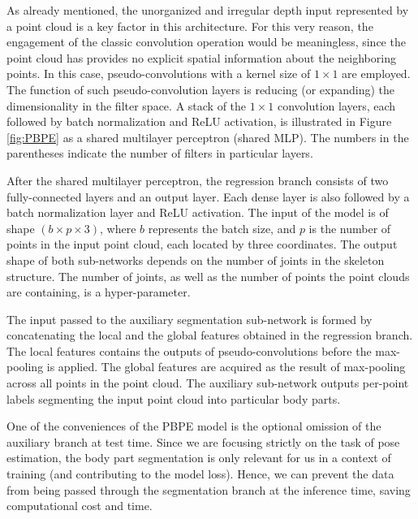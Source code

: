 \noindent
As already mentioned, the unorganized and irregular depth input represented by a point cloud is a key factor in this architecture. For this very reason, the engagement of the classic convolution operation would be meaningless, since the point cloud has provides no explicit spatial information about the neighboring points. In this case, pseudo-convolutions with a kernel size of $1\times1$ are employed. The function of such pseudo-convolution layers is reducing (or expanding) the dimensionality in the filter space. A stack of the $1 \times 1$ convolution layers, each followed by batch normalization and ReLU activation, is illustrated in Figure \ref{fig:PBPE} as a shared multilayer perceptron (shared MLP). The numbers in the parentheses indicate the number of filters in particular layers.\par
\vspace{5mm}
\noindent After the shared multilayer perceptron, the regression branch consists of two fully-connected layers and an output layer. Each dense layer is also followed by a batch normalization layer and ReLU activation. The input of the model is of shape $(b \times p \times 3)$, where $b$ represents the batch size, and $p$ is the number of points in the input point cloud, each located by three coordinates. The output shape of both sub-networks depends on the number of joints in the skeleton structure. The number of joints, as well as the number of points the point clouds are containing, is a hyper-parameter.\par
\vspace{5mm}
\noindent The input passed to the auxiliary segmentation sub-network is formed by concatenating the local and the global features obtained in the regression branch. The local features contains the outputs of pseudo-convolutions before the max-pooling is applied. The global features are acquired as the result of max-pooling across all points in the point cloud. The auxiliary sub-network outputs per-point labels segmenting the input point cloud into particular body parts.\par
\vspace{5mm}
\noindent One of the conveniences of the PBPE model is the optional omission of the auxiliary branch at test time. Since we are focusing strictly on the task of pose estimation, the body part segmentation is only relevant for us in a context of training (and contributing to the model loss). Hence, we can prevent the data from being passed through the segmentation branch at the inference time, saving computational cost and time.

